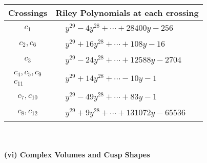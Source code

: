 \documentclass[1p]{elsarticle_modified}
\theoremstyle{definition}
\begin{document}
\begin{tabular}{m{50pt}|m{274pt}}
Crossings & \hspace{64pt}Riley Polynomials at each crossing \\
\hline $$\begin{aligned}c_{1}\end{aligned}$$&$\begin{aligned}
&y^{29}-4 y^{28}+\cdots+28400 y-256
\end{aligned}$\\
\hline $$\begin{aligned}c_{2},c_{6}\end{aligned}$$&$\begin{aligned}
&y^{29}+16 y^{28}+\cdots+108 y-16
\end{aligned}$\\
\hline $$\begin{aligned}c_{3}\end{aligned}$$&$\begin{aligned}
&y^{29}-24 y^{28}+\cdots+12588 y-2704
\end{aligned}$\\
\hline $$\begin{aligned}c_{4},c_{5},c_{9}\\c_{11}\end{aligned}$$&$\begin{aligned}
&y^{29}+14 y^{28}+\cdots-10 y-1
\end{aligned}$\\
\hline $$\begin{aligned}c_{7},c_{10}\end{aligned}$$&$\begin{aligned}
&y^{29}-49 y^{28}+\cdots+83 y-1
\end{aligned}$\\
\hline $$\begin{aligned}c_{8},c_{12}\end{aligned}$$&$\begin{aligned}
&y^{29}+9 y^{28}+\cdots+131072 y-65536
\end{aligned}$\\
\hline
\end{tabular}\\~\\
\newpage\flushleft \textbf{(vi) Complex Volumes and Cusp Shapes}
\end{document}

